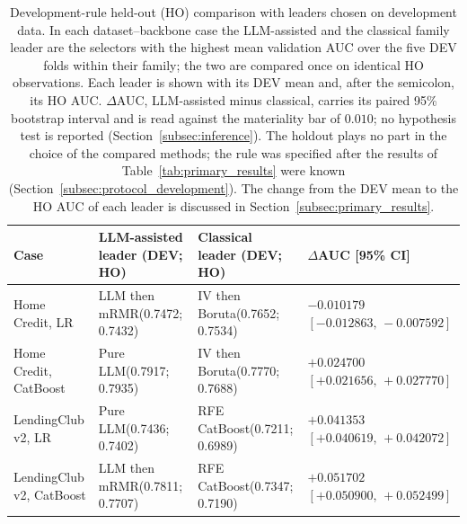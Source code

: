\documentclass[final,5p,twocolumn]{elsarticle}
\begin{document}
\begin{table}[htbp]
\centering
\scriptsize
\setlength{\tabcolsep}{3pt}
\begin{threeparttable}
\caption{Development-rule held-out (HO) comparison with leaders chosen on development data. In each dataset--backbone case the LLM-assisted and the classical family leader are the selectors with the highest mean validation AUC over the five DEV folds within their family; the two are compared once on identical HO observations. Each leader is shown with its DEV mean and, after the semicolon, its HO AUC. $\Delta$AUC, LLM-assisted minus classical, carries its paired 95\% bootstrap interval and is read against the materiality bar of $0.010$; no hypothesis test is reported (Section~\ref{subsec:inference}). The holdout plays no part in the choice of the compared methods; the rule was specified after the results of Table~\ref{tab:primary_results} were known (Section~\ref{subsec:protocol_development}). The change from the DEV mean to the HO AUC of each leader is discussed in Section~\ref{subsec:primary_results}.}
\label{tab:confirmatory}
\begin{tabular}{@{}L{24mm}L{30mm}L{27mm}L{38mm}@{}}
\toprule
Case & LLM-assisted leader (DEV; HO) & Classical leader (DEV; HO) & $\Delta$AUC [95\% CI] \\
\midrule
Home Credit, LR & LLM then mRMR\newline (0.7472; 0.7432) & IV then Boruta\newline (0.7652; 0.7534) & $-0.010179$\newline $[-0.012863,\,-0.007592]$ \\
\addlinespace
Home Credit, CatBoost & Pure LLM\newline (0.7917; 0.7935) & IV then Boruta\newline (0.7770; 0.7688) & $+0.024700$\newline $[+0.021656,\,+0.027770]$ \\
\addlinespace
LendingClub v2, LR & Pure LLM\newline (0.7436; 0.7402) & RFE CatBoost\newline (0.7211; 0.6989) & $+0.041353$\newline $[+0.040619,\,+0.042072]$ \\
\addlinespace
LendingClub v2, CatBoost & LLM then mRMR\newline (0.7811; 0.7707) & RFE CatBoost\newline (0.7347; 0.7190) & $+0.051702$\newline $[+0.050900,\,+0.052499]$ \\

\end{tabular}
\end{threeparttable}
\end{table}
\end{document}
